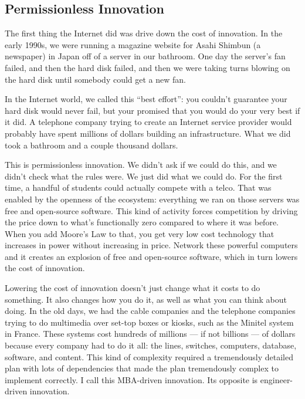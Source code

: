 \subsection{Permissionless Innovation}

The first thing the Internet did was drive down the cost of innovation. In the early 1990s, we were running a magazine website for Asahi Shimbun (a newspaper) in Japan off of a server in our bathroom. One day the server's fan failed, and then the hard disk failed, and then we were taking turns blowing on the hard disk until somebody could get a new fan.

In the Internet world, we called this ``best effort'':  you couldn't guarantee your hard disk would never fail, but your promised that you would do your very best if it did. A telephone company trying to create an Internet service provider would probably have spent millions of dollars building an infrastructure. What we did took a bathroom and a couple thousand dollars.

This is permissionless innovation. We didn't ask if we could do this, and we didn't check what the rules were. We just did what we could do. For the first time, a handful of students could actually compete with a telco. That was enabled by the openness of the ecosystem: everything we ran on those servers was free and open-source software. This kind of activity forces competition by driving the price down to what's functionally zero compared to where it was before. When you add Moore's Law to that, you get very low cost technology that increases in power without increasing in price. Network these powerful computers and it creates an explosion of free and open-source software, which in turn lowers the cost of innovation.

Lowering the cost of innovation doesn't just change what it costs to do something. It also changes how you do it, as well as what you can think about doing. In the old days, we had the cable companies and the telephone companies trying to do multimedia over set-top boxes or kiosks, such as the Minitel system in France. These systems cost hundreds of millions --- if not billions --- of dollars because every company had to do it all: the lines, switches, computers, database, software, and content. This kind of complexity required a tremendously detailed plan with lots of dependencies that made the plan tremendously complex to implement correctly. I call this \ac{MBA}-driven innovation. Its opposite is engineer-driven innovation.


